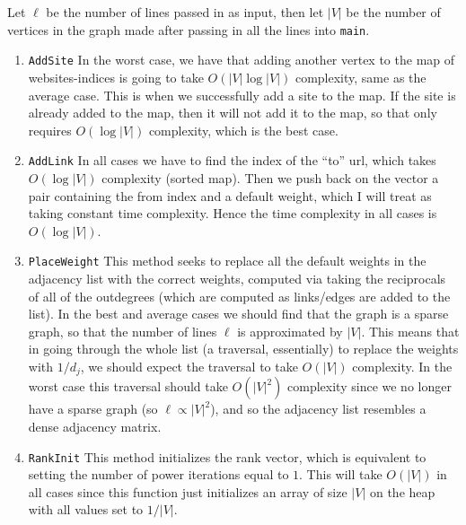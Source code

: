 \documentclass[11pt]{article}
\begin{document}
Let $\ell$ be the number of lines passed in as input, then let $|V|$ be the number of vertices in the graph made after passing in all the lines into \texttt{main}.

\begin{enumerate}
  \item \texttt{AddSite} In the worst case, we have that adding another vertex to the map of websites-indices is going to take $O(|V|\log|V|)$ complexity, same as the average case. This is when we successfully add a site to the map. If the site is already added to the map, then it will not add it to the map, so that only requires $O(\log|V|)$ complexity, which is the best case.
  \item \texttt{AddLink} In all cases we have to find the index of the ``to'' url, which takes $O(\log|V|)$ complexity (sorted map). Then we push back on the vector a pair containing the from index and a default weight, which I will treat as taking constant time complexity. Hence the time complexity in all cases is $O(\log|V|)$.
  \item \texttt{PlaceWeight} This method seeks to replace all the default weights in the adjacency list with the correct weights, computed via taking the reciprocals of all of the outdegrees (which are computed as links/edges are added to the list). In the best and average cases we should find that the graph is a sparse graph, so that the number of lines $\ell$ is approximated by $|V|$. This means that in going through the whole list (a traversal, essentially) to replace the weights with $1/d_j$, we should expect the traversal to take $O(|V|)$ complexity. In the worst case this traversal should take $O(|V|^2)$ complexity since we no longer have a sparse graph (so $\ell \propto |V|^2$), and so the adjacency list resembles a dense adjacency matrix.
  \item \texttt{RankInit} This method initializes the rank vector, which is equivalent to setting the number of power iterations equal to $1$. This will take $O(|V|)$ in all cases since this function just initializes an array of size $|V|$ on the heap with all values set to $1/|V|$.

\end{enumerate}
\end{document}
